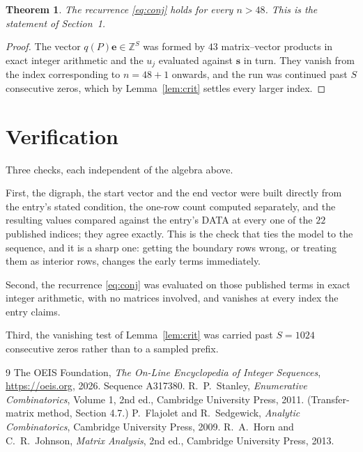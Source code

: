 \documentclass[11pt,a4paper]{article}
\theoremstyle{plain}
\newtheorem{theorem}{Theorem}
\theoremstyle{definition}
\begin{document}
\begin{theorem}
The recurrence \eqref{eq:conj} holds for every $n>48$. This is the statement of
Section~1.
\end{theorem}

\begin{proof}
The vector $q(P)\mathbf{e}\in\mathbb{Z}^{S}$ was formed by $43$ matrix--vector
products in exact integer arithmetic and the $u_j$ evaluated against $\mathbf{s}$ in turn.
They vanish from the index corresponding to $n=48+1$ onwards, and the run was continued
past $S$ consecutive zeros, which by Lemma~\ref{lem:crit} settles every larger index.
\end{proof}

\section{Verification}

Three checks, each independent of the algebra above.

First, the digraph, the start vector and the end vector were built directly from the
entry's stated condition, the one-row count computed separately, and the resulting values
compared against the entry's DATA at every one of the $22$ published indices; they
agree exactly. This is the check that ties the model to the sequence, and it is a sharp one:
getting the boundary rows wrong, or treating them as interior rows, changes the early terms
immediately.

Second, the recurrence \eqref{eq:conj} was evaluated on those published terms in exact
integer arithmetic, with no matrices involved, and vanishes at every index the entry claims.

Third, the vanishing test of Lemma~\ref{lem:crit} was carried past $S=1024$ consecutive
zeros rather than to a sampled prefix.

\begin{thebibliography}{9}
 The OEIS Foundation, \emph{The On-Line Encyclopedia of Integer
Sequences}, \url{https://oeis.org}, 2026. Sequence A317380.
 R.~P.~Stanley, \emph{Enumerative Combinatorics}, Volume 1, 2nd ed.,
Cambridge University Press, 2011. (Transfer-matrix method, Section 4.7.)
 P.~Flajolet and R.~Sedgewick, \emph{Analytic Combinatorics}, Cambridge
University Press, 2009.
 R.~A.~Horn and C.~R.~Johnson, \emph{Matrix Analysis}, 2nd ed., Cambridge
University Press, 2013.
\end{thebibliography}
\end{document}
